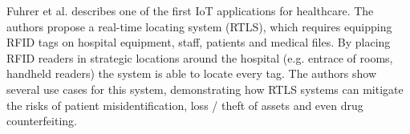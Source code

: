 


%
%
%
%


Fuhrer et al. \cite{Fuhrer2006} describes one of the first IoT applications for healthcare. The authors propose a real-time locating system (RTLS), which requires equipping RFID tags on hospital equipment, staff, patients and medical files. By placing RFID readers in strategic locations around the hospital (e.g. entrace of rooms, handheld readers) the system is able to locate every tag. The authors show several use cases for this system, demonstrating how RTLS systems can mitigate the risks of patient misidentification, loss / theft of assets and even drug counterfeiting.

